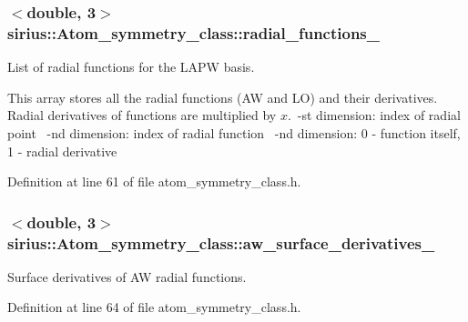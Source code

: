 \subsubsection[{radial\+\_\+functions\+\_\+}]{$<$double, 3$>$ sirius\+::\+Atom\+\_\+symmetry\+\_\+class\+::radial\+\_\+functions\+\_\+\hspace{0.3cm}{\ttfamily [private]}}\label{classsirius_1_1_atom__symmetry__class_a386343d0b45a21cdccecd10e71c7c3f4}


List of radial functions for the L\+A\+P\+W basis. 

This array stores all the radial functions (A\+W and L\+O) and their derivatives. Radial derivatives of functions are multiplied by $ x $.~-\/st dimension\+: index of radial point ~-\/nd dimension\+: index of radial function ~-\/nd dimension\+: 0 -\/ function itself, 1 -\/ radial derivative 

Definition at line 61 of file atom\+\_\+symmetry\+\_\+class.\+h.

\hypertarget{classsirius_1_1_atom__symmetry__class_a5166789d0468f3b5ef13cabe4fd81d85}{}
\subsubsection[{aw\+\_\+surface\+\_\+derivatives\+\_\+}]{$<$double, 3$>$ sirius\+::\+Atom\+\_\+symmetry\+\_\+class\+::aw\+\_\+surface\+\_\+derivatives\+\_\+\hspace{0.3cm}{\ttfamily [private]}}\label{classsirius_1_1_atom__symmetry__class_a5166789d0468f3b5ef13cabe4fd81d85}


Surface derivatives of A\+W radial functions. 



Definition at line 64 of file atom\+\_\+symmetry\+\_\+class.\+h.

\hypertarget{classsirius_1_1_atom__symmetry__class_a67ce6c9408276241634a0108beb18ce1}{}
